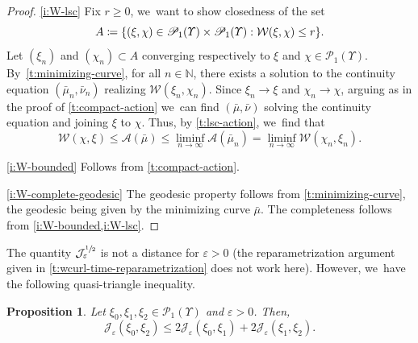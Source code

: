 \documentclass[10pt]{amsart}
\newtheorem{proposition}[theorem]{Proposition}
\theoremstyle{definition}
\theoremstyle{remark}
\DeclarePairedDelimiter{\set}{\lbrace}{\rbrace}
\begin{document}
\begin{proof}
\cref{i:W-lsc}
Fix $r \geq 0$, we~want to show closedness of the set
\begin{equation*}
A \coloneq \set*{ (\xi, \chi) \in \mathscr{P}_{1}(\varUpsilon) \times \mathscr{P}_{1}(\varUpsilon) : \mathcal{W}(\xi, \chi) \leq r }.
\end{equation*}
Let $(\xi_{n})$ and $(\chi_{n}) \subset A$ converging respectively to $\xi$ and $\chi \in \mathscr{P}_{1}(\varUpsilon)$.
By~\cref{t:minimizing-curve}, for all $n \in \mathbb{N}$, there exists a solution to the continuity equation $(\bar{\mu}_{n}, \bar{\nu}_{n})$ realizing $\mathcal{W}(\xi_{n}, \chi_{n})$.
Since $\xi_{n} \to \xi$ and $\chi_{n} \to \chi$, arguing as in the proof of \cref{t:compact-action} we~can find $(\bar{\mu}, \bar{\nu})$ solving the continuity equation and joining $\xi$ to $\chi$.
Thus, by \cref{t:lsc-action}, we~find that
\begin{equation*}
\mathcal{W}(\chi, \xi) \leq \mathcal{A}(\bar{\mu}) \leq \liminf_{n \to \infty} \mathcal{A}(\bar{\mu}_{n}) = \liminf_{n \to \infty} \mathcal{W}(\chi_{n}, \xi_{n}).
\end{equation*}

\cref{i:W-bounded}
Follows from \cref{t:compact-action}.

\cref{i:W-complete-geodesic}
The geodesic property follows from \cref{t:minimizing-curve}, the geodesic being given by the minimizing curve $\bar{\mu}$.
The completeness follows from \cref{i:W-bounded,i:W-lsc}.
\end{proof}

The quantity $\mathcal{J}_{\varepsilon}^{\sfrac{1}{2}}$ is not a distance for $\varepsilon > 0$ (the reparametrization argument given in \cref{t:wcurl-time-reparametrization} does not work here).
However, we~have the following quasi-triangle inequality.

\begin{proposition}\label{t:entropic-triangle-inequality}
Let $\xi_{0}, \xi_{1}, \xi_{2} \in \mathscr{P}_{1}(\varUpsilon)$ and $\varepsilon > 0$.
Then,
\begin{equation*}
\mathcal{J}_{\varepsilon}(\xi_{0}, \xi_{2}) \leq 2 \mathcal{J}_{\varepsilon}(\xi_{0}, \xi_{1}) + 2 \mathcal{J}_{\varepsilon}(\xi_{1}, \xi_{2}).
\end{equation*}
\end{proposition}
\end{document}
